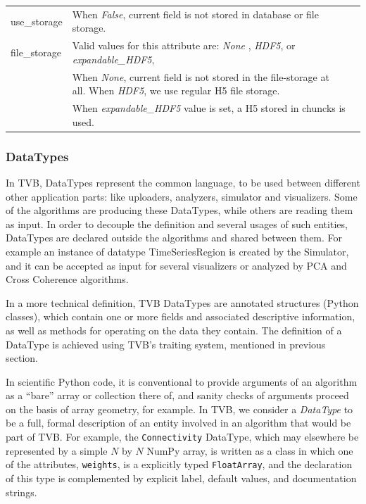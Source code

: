 \begin{center}
\begin{table}[ht]
\begin{tabularx}{\textwidth}{lll}
		use\_storage	& When \emph{False}, current field is not stored in database or file storage. \\
		file\_storage	& Valid values for this attribute are: \emph{None} , \emph{HDF5}, or  \emph{expandable\_HDF5}, \\
					& When \emph{None}, current field is not stored in the file-storage at all. When \emph{HDF5}, we use regular H5 file storage. \\
					& When \emph{expandable\_HDF5} value is set, a H5 stored in chuncks is used. \\
		\bottomrule
    	\end{tabularx}
	\end{table}
\end{center}


	\subsubsection{DataTypes}

In TVB, DataTypes represent the common language, to be used between different other application parts: 
like uploaders, analyzers, simulator and visualizers.
Some of the algorithms are producing these DataTypes, while others are reading them as input. 
In order to decouple the definition and several usages of such entities, DataTypes are declared outside the algorithms 
and shared between them. For example an instance of datatype TimeSeriesRegion is created by the Simulator, 
and it can be accepted as input for several visualizers or analyzed by PCA and Cross Coherence algorithms.

In a more technical definition, TVB DataTypes are annotated structures (Python classes), which
contain one or more fields and associated descriptive information, as
well as methods for operating on the data they contain. The definition of a
DataType is achieved using TVB's traiting system, mentioned in previous section.

In scientific Python code, it is conventional to provide arguments
of an algorithm as a ``bare'' array or collection there of, and sanity
checks of arguments proceed on the basis of array geometry, for example.
In TVB, we consider a \textit{DataType} to be a full, formal description of 
an entity involved in an algorithm that would be part of TVB. 
For example, the \texttt{Connectivity} DataType, which may elsewhere
be represented by a simple $N$ by $N$ NumPy array, is written as a class
in which one of the attributes, \texttt{weights}, is a explicitly typed 
\texttt{FloatArray}, and the declaration of this type is complemented by
explicit label, default values, and documentation strings. 

